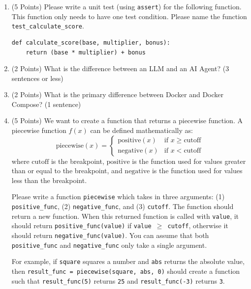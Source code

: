 \documentclass[11pt]{article}
\begin{document}
\begin{enumerate}
\vspace{6cm} 



\item (5 Points) Please write a unit test (using \texttt{assert}) for the following function. This function only needs to have one test condition. Please name the function \texttt{test\_calculate\_score}.


\begin{verbatim}
def calculate_score(base, multiplier, bonus):
    return (base * multiplier) + bonus
\end{verbatim}


\vspace{5cm}

\item (2 Points) What is the difference between an LLM and an AI Agent? (3 sentences or less)

\vspace{5cm}

\item (2 Points) What is the primary difference between Docker and Docker Compose? (1 sentence)

\vspace{5cm}


\item (5 Points) We want to create a function that returns a piecewise function. A piecewise function $f(x)$ can be defined mathematically as:
\[
\text{piecewise}(x) = \begin{cases}
\text{positive}(x) & \text{if } x \geq \text{cutoff} \\
\text{negative}(x) & \text{if } x < \text{cutoff}
\end{cases}
\]
where $\text{cutoff}$ is the breakpoint, $\text{positive}$ is the function used for values greater than or equal to the breakpoint, and $\text{negative}$ is the function used for values less than the breakpoint.

Please write a function \texttt{piecewise} which takes in three arguments: (1) \texttt{positive\_func}, (2) \texttt{negative\_func}, and (3) \texttt{cutoff}. The function should return a new function. When this returned function is called with \texttt{value}, it should return \texttt{positive\_func(value)} if \texttt{value $\geq$ cutoff}, otherwise it should return \texttt{negative\_func(value)}. You can assume that both \texttt{positive\_func} and \texttt{negative\_func} only take a single argument.

For example, if \texttt{square} squares a number and \texttt{abs} returns the absolute value, then \texttt{result\_func = piecewise(square, abs, 0)} should create a function such that \texttt{result\_func(5)} returns \texttt{25} and \texttt{result\_func(-3)} returns \texttt{3}.



\end{enumerate}
\end{document}
